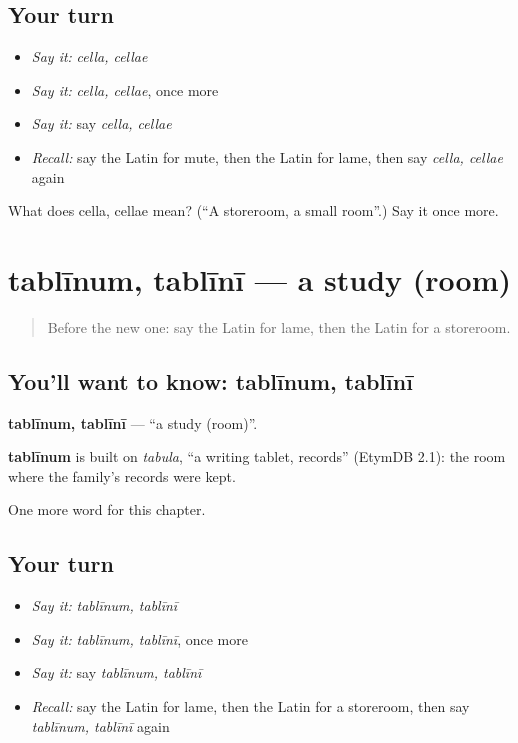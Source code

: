 \subsection*{Your turn}
\begin{itemize}
\raggedright
  \item \emph{Say it:} \emph{cella, cellae}
  \item \emph{Say it:} \emph{cella, cellae}, once more
  \item \emph{Say it:} say \emph{cella, cellae}
  \item \emph{Recall:} say the Latin for mute, then the Latin for lame, then say \emph{cella, cellae} again
\end{itemize}

\begin{tcolorbox}[breakable,colback=teal!4,colframe=teal!35!black,title={Before you move on}]
What does cella, cellae mean? (\textquotedblleft{}A storeroom, a small room\textquotedblright{}.) Say it once more.
\end{tcolorbox}
\section[tablīnum, tablīnī]{tablīnum, tablīnī — a study (room)}

\label{lesson:LA-C185-tablinum}



\begin{quote}
Before the new one: say the Latin for lame, then the Latin for a storeroom.
\end{quote}

\subsection*{You'll want to know: tablīnum, tablīnī}
\textbf{tablīnum, tablīnī} — \textquotedblleft{}a study (room)\textquotedblright{}.

\begin{cousinweb}
\textbf{tablīnum} is built on \emph{tabula}, \textquotedblleft{}a writing tablet, records\textquotedblright{} (EtymDB 2.1): the room where the family's records were kept.
\end{cousinweb}

\begin{grammarlens}[title={What you've built}]
One more word for this chapter.
\end{grammarlens}

\subsection*{Your turn}
\begin{itemize}
\raggedright
  \item \emph{Say it:} \emph{tablīnum, tablīnī}
  \item \emph{Say it:} \emph{tablīnum, tablīnī}, once more
  \item \emph{Say it:} say \emph{tablīnum, tablīnī}
  \item \emph{Recall:} say the Latin for lame, then the Latin for a storeroom, then say \emph{tablīnum, tablīnī} again
\end{itemize}

